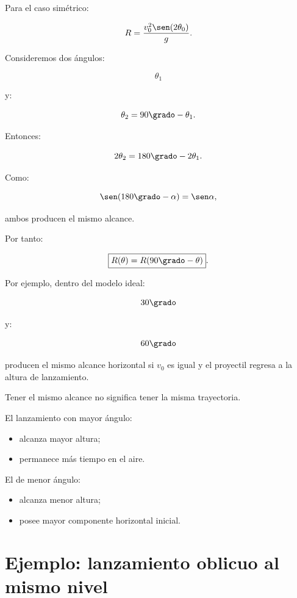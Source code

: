 Para el caso simétrico:

\[
R
=
\frac{
v_0^2\sen(2\theta_0)
}{
g
}.
\]

Consideremos dos ángulos:

\[
\theta_1
\]

y:

\[
\theta_2=90\grado-\theta_1.
\]

Entonces:

\[
2\theta_2
=
180\grado-2\theta_1.
\]

Como:

\[
\sen(180\grado-\alpha)=\sen\alpha,
\]

ambos producen el mismo alcance.

Por tanto:

\[
\boxed{
R(\theta)
=
R(90\grado-\theta)
}.
\]

Por ejemplo, dentro del modelo ideal:

\[
30\grado
\]

y:

\[
60\grado
\]

producen el mismo alcance horizontal si \(v_0\) es igual y el proyectil regresa a
la altura de lanzamiento.

\begin{interpretacion}
Tener el mismo alcance no significa tener la misma trayectoria.

El lanzamiento con mayor ángulo:

\begin{itemize}
    \item alcanza mayor altura;
    \item permanece más tiempo en el aire.
\end{itemize}

El de menor ángulo:

\begin{itemize}
    \item alcanza menor altura;
    \item posee mayor componente horizontal inicial.
\end{itemize}
\end{interpretacion}


\section{Ejemplo: lanzamiento oblicuo al mismo nivel}


